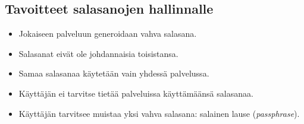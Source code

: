 \documentclass{tktltiki}
\begin{document}
\subsection{Tavoitteet salasanojen hallinnalle}

\begin{itemize}

  \item{Jokaiseen palveluun generoidaan vahva salasana.}
  \item{Salasanat eivät ole johdannaisia toisistansa.}
  \item{Samaa salasanaa käytetään vain yhdessä palvelussa.}
  \item{Käyttäjän ei tarvitse tietää palveluissa käyttämäänsä salasanaa.}
  \item{Käyttäjän tarvitsee muistaa yksi vahva salasana: salainen lause  (\emph{passphrase}).}

\end{itemize}
\end{document}
